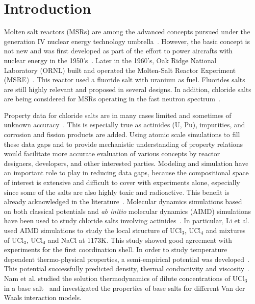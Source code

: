\documentclass[preprint,3p,10pt,twocolumn,number,sort&compress]{elsarticle}
\begin{document}

\section{Introduction}
\label{sec:intro}
Molten salt reactors (MSRs) are among the advanced concepts pursued under the generation IV nuclear energy technology umbrella~\cite{}. However, the basic concept is not new and was first developed as part of the effort to power aircrafts with nuclear energy in the 1950's~\cite{}. Later in the 1960's, Oak Ridge National Laboratory (ORNL) built and operated the Molten-Salt Reactor Experiment (MSRE)~\cite{}. This reactor used a fluoride salt with uranium as fuel. Fluorides salts are still highly relevant and proposed in several designs. In addition, chloride salts are being considered for MSRs operating in the fast neutron spectrum~\cite{}. 

Property data for chloride salts are in many cases limited and sometimes of unknown accuracy~\cite{}. This is especially true as actinides (U, Pu), impurities, and corrosion and fission products are added. Using atomic scale simulations to fill these data gaps and to provide mechanistic understanding of property relations would facilitate more accurate evaluation of various concepts by reactor designers, developers, and other interested parties. Modeling and simulation have an important role to play in reducing data gaps, because the compositional space of interest is extensive and difficult to cover with experiments alone, especially since some of the salts are also highly toxic and radioactive. This benefit is already acknowledged in the literature~\cite{}. Molecular dynamics simulations based on both classical potentials and \textit{ab initio} molecular dynamics (AIMD) simulations have been used to study chloride salts involving actinides~\cite{}. In particular, Li et al. used AIMD simulations to study the local structure of UCl$_3$, UCl$_4$ and mixtures of UCl$_3$, UCl$_4$ and NaCl at 1173K. This study showed good agreement with experiments for the first coordination shell. %
In order to study temperature dependent thermo-physical properties, a semi-empirical potential was developed~\cite{}. This potential successfully predicted density, thermal conductivity and viscosity~\cite{}. Nam et al. studied the solution thermodynamics of dilute concentrations of UCl$_3$ in a base salt~\cite{} and investigated the properties of base salts for different Van der Waals interaction models. 
\end{document}

